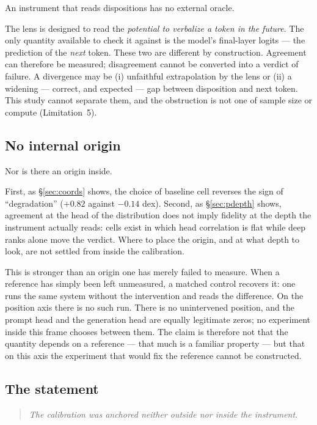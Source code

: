 \documentclass[11pt]{article}
\begin{document}
An instrument that reads dispositions has no external oracle.

The lens is designed to read the \emph{potential to verbalize a token in
the future}. The only quantity available to check it against is the
model's final-layer logits --- the prediction of the \emph{next} token.
These two are different by construction. Agreement can therefore be
measured; disagreement cannot be converted into a verdict of failure. A
divergence may be (i) unfaithful extrapolation by the lens or (ii) a
widening --- correct, and expected --- gap between disposition and next
token. This study cannot separate them, and the obstruction is not one of
sample size or compute (Limitation~5).

\subsection{No internal origin}

Nor is there an origin inside.

First, as \S\ref{sec:coords} shows, the choice of baseline cell reverses
the sign of ``degradation'' ($+0.82$ against $-0.14$ dex). Second, as
\S\ref{sec:pdepth} shows, agreement at the head of the distribution does
not imply fidelity at the depth the instrument actually reads: cells
exist in which head correlation is flat while deep ranks alone move the
verdict. Where to place the origin, and at what depth to look, are not
settled from inside the calibration.

This is stronger than an origin one has merely failed to measure. When a
reference has simply been left unmeasured, a matched control recovers it:
one runs the same system without the intervention and reads the
difference. On the position axis there is no such run. There is no
unintervened position, and the prompt head and the generation head are
equally legitimate zeros; no experiment inside this frame chooses between
them. The claim is therefore not that the quantity depends on a
reference --- that much is a familiar property --- but that on this axis
the experiment that would fix the reference cannot be constructed.

\subsection{The statement}

\begin{quote}\Large\itshape
The calibration was anchored neither outside nor inside the instrument.
\end{quote}
\end{document}
